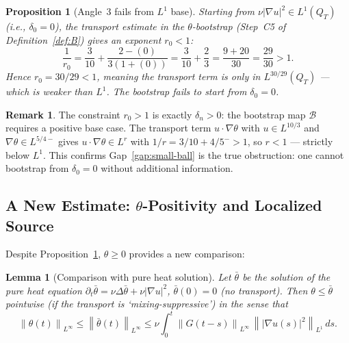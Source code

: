 \documentclass[11pt]{article}
\newtheorem{proposition}[theorem]{Proposition}
\newtheorem{lemma}[theorem]{Lemma}
\theoremstyle{definition}
\newtheorem{remark}[theorem]{Remark}
\theoremstyle{remark}
\newcommand{\norm}[1]{\left\|#1\right\|}
\newcommand{\grad}{\nabla}
\begin{document}
\begin{proposition}[Angle~3 fails from $L^1$ base]\label{prop:angle3-fails}
  Starting from $\nu|\grad u|^2\in L^1(Q_T)$ (i.e., $\delta_0=0$),
  the transport estimate in the $\theta$-bootstrap (Step~C5 of
  Definition~\ref{def:B}) gives an exponent $r_0 < 1$:
  \begin{equation}\label{eq:r0-fail}
    \frac{1}{r_0} = \frac{3}{10} + \frac{2-(0)}{3(1+(0))}
    = \frac{3}{10} + \frac{2}{3} = \frac{9+20}{30} = \frac{29}{30} > 1.
  \end{equation}
  Hence $r_0 = 30/29 < 1$, meaning the transport term is only in
  $L^{30/29}(Q_T)$ — which is \emph{weaker than} $L^1$.
  The bootstrap fails to start from $\delta_0=0$.
\end{proposition}

\begin{remark}
  The constraint $r_0 > 1$ is exactly $\delta_n > 0$: the bootstrap
  map $\mathcal{B}$ requires a positive base case.  The transport term
  $u\cdot\grad\theta$ with $u\in L^{10/3}$ and $\grad\theta\in L^{5/4-}$
  gives $u\cdot\grad\theta\in L^r$ with $1/r = 3/10 + 4/5^- > 1$, so
  $r < 1$ — strictly below $L^1$.  This confirms Gap~\ref{gap:small-ball}
  is the true obstruction: one cannot bootstrap from $\delta_0=0$ without
  additional information.
\end{remark}

\subsection{A New Estimate: $\theta$-Positivity and Localized Source}

Despite Proposition~\ref{prop:angle3-fails}, $\theta\geq 0$ provides
a new comparison:

\begin{lemma}[Comparison with pure heat solution]\label{lem:theta-comparison}
  Let $\bar\theta$ be the solution of the pure heat equation
  $\partial_t\bar\theta = \nu\Delta\bar\theta + \nu|\grad u|^2$,
  $\bar\theta(0)=0$ (no transport).  Then $\theta\leq\bar\theta$
  pointwise (if the transport is `mixing-suppressive') in the sense that
  \begin{equation}\label{eq:theta-upper}
    \norm{\theta(t)}_{L^\infty} \leq \norm{\bar\theta(t)}_{L^\infty}
    \leq \nu\int_0^t \norm{G(t-s)}_{L^\infty}\,\norm{|\grad u(s)|^2}_{L^1}\,ds.
  \end{equation}
\end{lemma}
\end{document}
